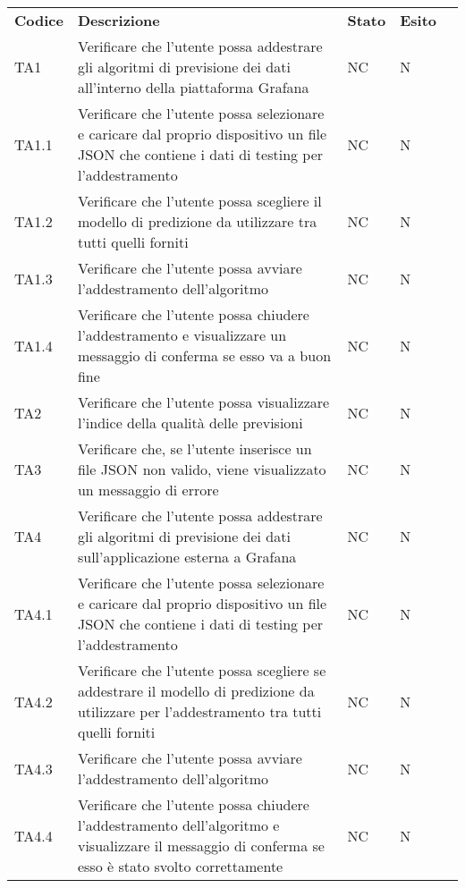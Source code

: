 \begin{longtable} {
		>{\centering}p{15mm} 
		>{\centering}p{79.5mm}
		>{\centering}p{10mm} 
		>{\centering}p{10mm}
		>{}p{0mm}}
	\rowcolor{gray!50}
	\textbf{Codice} & \textbf{Descrizione} & \textbf{Stato} & \textbf{Esito} &\TBstrut \\
	TA1 & Verificare che l'utente possa addestrare gli algoritmi di previsione dei dati all'interno della piattaforma Grafana\glo & NC & N  &\TBstrut \\ [2mm]
	TA1.1 & Verificare che l'utente possa selezionare e caricare dal proprio dispositivo un file JSON che contiene i dati di testing per l'addestramento& NC & N  &\TBstrut \\ [2mm]
	TA1.2 & Verificare che l'utente possa scegliere il modello di predizione da utilizzare tra tutti quelli forniti & NC & N  &\TBstrut \\ [2mm]
	TA1.3 & Verificare che l'utente possa avviare l'addestramento dell'algoritmo & NC & N  &\TBstrut \\ [2mm]
	TA1.4 & Verificare che l'utente possa chiudere l'addestramento e visualizzare un messaggio di conferma se esso va a buon fine & NC & N  &\TBstrut \\ [2mm]
	TA2 & Verificare che l'utente possa visualizzare l'indice della qualità delle previsioni & NC & N  &\TBstrut \\ [2mm]
	TA3 & Verificare che, se l'utente inserisce un file JSON non valido, viene visualizzato un messaggio di errore & NC & N  &\TBstrut \\ [2mm]
	TA4 & Verificare che l'utente possa addestrare gli algoritmi di previsione dei dati sull'applicazione esterna a Grafana\glo & NC & N  &\TBstrut \\ [2mm]
	TA4.1 & Verificare che l'utente possa selezionare e caricare dal proprio dispositivo un file JSON che contiene i dati di testing per l'addestramento & NC & N  &\TBstrut \\ [2mm]
	TA4.2 & Verificare che l'utente possa scegliere se addestrare il modello di predizione da utilizzare per l'addestramento tra tutti quelli forniti & NC & N  &\TBstrut \\ [2mm]
	TA4.3 & Verificare che l'utente possa avviare l'addestramento dell'algoritmo & NC & N  &\TBstrut \\ [2mm]
	TA4.4 & Verificare che l'utente possa chiudere l'addestramento dell'algoritmo e visualizzare il messaggio di conferma se esso è stato svolto correttamente & NC & N  &\TBstrut \\ [2mm]

\end{longtable}
